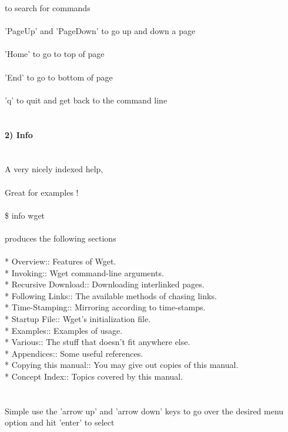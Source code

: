 \documentclass[10pt,a4paper]{article}
\begin{document}
to search for commands \\
\\
'PageUp'  and 'PageDown' to go up and down a page\\
\\
'Home' to go to top of page\\
\\
'End' to go to bottom of page\\
\\
'q' to quit and get back to the command line\\
\\
\\
\textbf{{\large 2) Info }}\\
\\
\\
A very nicely indexed help, \\
\\
Great for examples !\\
\\
\$ info wget\\
\\
produces the following sections\\
\\
* Overview::                    Features of Wget.\\
* Invoking::                    Wget command-line arguments.\\
* Recursive Download::          Downloading interlinked pages.\\
* Following Links::             The available methods of chasing links.\\
* Time-Stamping::               Mirroring according to time-stamps.\\
* Startup File::                Wget’s initialization file.\\
* Examples::                    Examples of usage.\\
* Various::                     The stuff that doesn’t fit anywhere else.\\
* Appendices::                  Some useful references.\\
* Copying this manual::         You may give out copies of this manual.\\
* Concept Index::               Topics covered by this manual.\\
\\
\\
Simple use the 'arrow up' and 'arrow down' keys to go over the desired menu option and hit 'enter' to select\\
\end{document}
